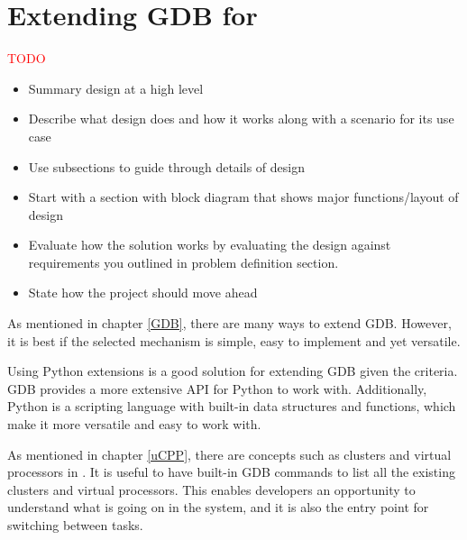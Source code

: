 \chapter{Extending GDB for \uCPP}


\textcolor{red}{TODO}
\begin{itemize}
\item Summary design at a high level
\item Describe what design does and how it works along with a scenario for its
use case
\item Use subsections to guide through details of design
\item Start with a section with block diagram that shows major functions/layout
of design
\item Evaluate how the solution works by evaluating the design against
requirements you outlined in problem definition section.
\item State how the project should move ahead
\end{itemize}

As mentioned in chapter \ref{GDB}, there are many ways to extend GDB. However,
it is best if the selected mechanism is simple, easy to implement and yet
versatile.

Using Python extensions is a good solution for extending GDB given the criteria.
GDB provides a more extensive API for Python to work with. Additionally, Python
is a scripting language with built-in data structures and functions, which make
it more versatile and easy to work with.

As mentioned in chapter \ref{uCPP}, there are concepts such as clusters and
virtual processors in \uCPP. It is useful to have built-in GDB commands to list
all the existing clusters and virtual processors. This enables developers an
opportunity to understand what is going on in the system, and it is also the
entry point for switching between tasks.
